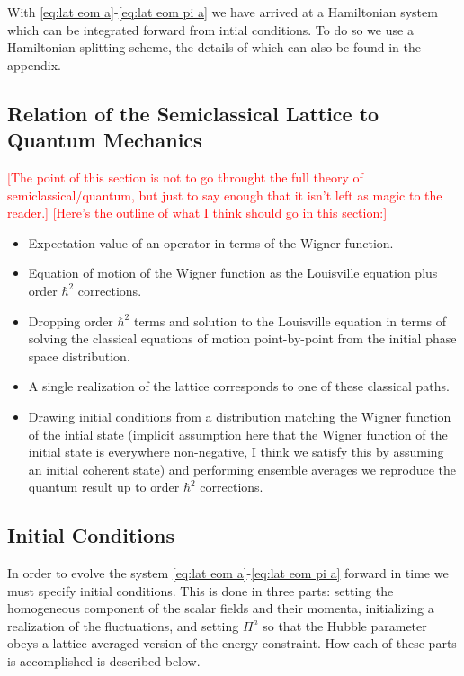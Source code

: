 With \eqref{eq:lat eom a}-\eqref{eq:lat eom pi a} we have arrived at a Hamiltonian system which can be integrated forward from intial conditions. To do so we use a Hamiltonian splitting scheme, the details of which can also be found in the appendix.

\subsection{Relation of the Semiclassical Lattice to Quantum Mechanics}
\textcolor{red}{[The point of this section is not to go throught the full theory of semiclassical/quantum, but just to say enough that it isn't left as magic to the reader.]}
\textcolor{red}{[Here's the outline of what I think should go in this section:]}
\begin{itemize}
  \color{red}
  \item Expectation value of an operator in terms of the Wigner function.
  \item Equation of motion of the Wigner function as the Louisville equation plus order $\hbar^2$ corrections.
  \item Dropping order $\hbar^2$ terms and solution to the Louisville equation in terms of solving the classical equations of motion point-by-point from the initial phase space distribution.
  \item A single realization of the lattice corresponds to one of these classical paths.
  \item Drawing initial conditions from a distribution matching the Wigner function of the intial state (implicit assumption here that the Wigner function of the initial state is everywhere non-negative, I think we satisfy this by assuming an initial coherent state) and performing ensemble averages we reproduce the quantum result up to order $\hbar^2$ corrections.
\end{itemize}
  
\subsection{Initial Conditions} \label{sec:ICs}
In order to evolve the system \eqref{eq:lat eom a}-\eqref{eq:lat eom pi a} forward in time we must specify initial conditions. This is done in three parts: setting the homogeneous component of the scalar fields and their momenta, initializing a realization of the fluctuations, and setting $\Pi^a$ so that the Hubble parameter obeys a lattice averaged version of the energy constraint. How each of these parts is accomplished is described below.

